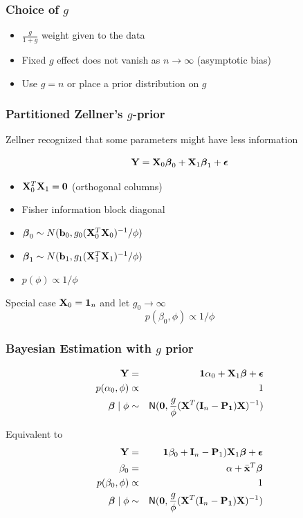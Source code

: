 \documentclass[]{beamer}\usepackage[]{graphicx}\usepackage[]{color}
\begin{document}
\begin{frame} \frametitle{Choice of $g$}
\begin{itemize}
  \item $\frac{g}{1 + g}$  weight given to the data \pause
  \item Fixed $g$ effect does not vanish as $n \to \infty$  (asymptotic bias) \pause
  \item Use $g = n$ or place a prior distribution on $g$
\end{itemize}
\end{frame}


\begin{frame}
 \frametitle{Partitioned Zellner's $g$-prior }

Zellner recognized that some parameters might have less information

$$ \mathbf{Y} = \mathbf{X}_0 \boldsymbol{\beta}_0 + \mathbf{X}_1 \boldsymbol{\beta}_1 + \boldsymbol{\epsilon}$$

\begin{itemize}
\item $\mathbf{X}_0^T \mathbf{X}_1 = \mathbf{0}$ (orthogonal columns) \pause
\item Fisher information block diagonal \pause
\item $\boldsymbol{\beta}_0 \sim N( \mathbf{b}_0,  g_0 (\mathbf{X}_0^T\mathbf{X}_0)^{-1}/\phi)$ \pause
\item $\boldsymbol{\beta}_1 \sim N( \mathbf{b}_1,  g_1 (\mathbf{X}_1^T\mathbf{X}_1)^{-1}/\phi)$ \pause
\item $p(\phi) \propto 1/\phi$
\end{itemize}
Special case $\mathbf{X}_0 = \mathbf{1}_n$ and let $g_0 \to \infty$
$$p(\beta_0, \phi) \propto 1/\phi$$
\end{frame}

\begin{frame}[t]
  \frametitle{Bayesian Estimation with $g$ prior}

\begin{eqnarray*}
\mathbf{Y} & = & \mathbf{1} \alpha_0 + \mathbf{X}_1 \boldsymbol{\beta} + \boldsymbol{\epsilon} \\
p(\alpha_0, \phi) & \propto & 1 \\
\boldsymbol{\beta} \mid \phi & \sim & \textsf{N}(\mathbf{0}, \frac{g}{\phi} (\mathbf{X}^T (\mathbf{I}_n - \mathbf{P}_{\mathbf{1}}) \mathbf{X})^{-1})
\end{eqnarray*}\pause

Equivalent to
\begin{eqnarray*}
\mathbf{Y} & = & \mathbf{1} \beta_0 + \mathbf{I}_n - \mathbf{P}_1) \mathbf{X}_1 \boldsymbol{\beta} + \boldsymbol{\epsilon} \\
\beta_0 & = & \alpha + \bar{\mathbf{x}}^T \boldsymbol{\beta} \\
p(\beta_0, \phi) & \propto & 1 \\
\boldsymbol{\beta} \mid \phi & \sim & \textsf{N}(\mathbf{0}, \frac{g}{\phi} (\mathbf{X}^T (\mathbf{I}_n - \mathbf{P}_{\mathbf{1}}) \mathbf{X})^{-1})
\end{eqnarray*}
\end{frame}
\end{document}
